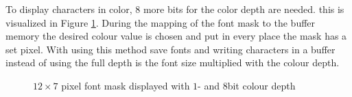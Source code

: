 To display characters in color, 8 more bits for the color depth are needed.
this is visualized in Figure \ref{fig:ganzes_fig}. During the mapping of the font mask to the buffer memory the desired colour value is chosen and put in every place the mask has a set pixel. With using this method save fonts and writing characters in a buffer instead of using the full depth is the font size multiplied with the colour depth.  

\begin{figure}[ht]
	\centering
	\caption{$12 \times 7$ pixel font mask displayed with $1$- and $8$bit colour depth}
	\label{fig:ganzes_fig}
\end{figure}



